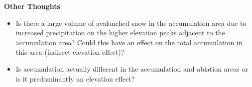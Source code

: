 \documentclass[12pt]{article}
\begin{document}
\noindent \textbf{Other Thoughts}
\begin{itemize}
\item Is there a large volume of avalanched snow in the accumulation area due to increased precipitation on the higher elevation peaks adjacent to the accumulation area? Could this have an effect on the total accumulation in this area (indirect elevation effect)?
\item Is accumulation actually different in the accumulation and ablation areas or is it predominantly an elevation effect?
\end{itemize}




\end{document}
